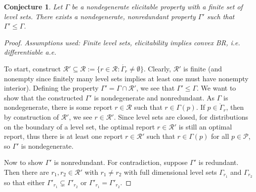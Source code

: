 \documentclass[12pt]{article}
\newcommand{\Comments}{1}
\newcommand{\mynote}[2]{\ifnum\Comments=1\textcolor{#1}{#2}\fi}
\newcommand{\jessie}[1]{\mynote{purple}{[JF: #1]}}
\renewcommand{\P}{\mathcal{P}}
\newcommand{\R}{\mathcal{R}}
\newcommand{\inter}[1]{\mathring{#1}}%
\newtheorem{conjecture}{Conjecture}
\begin{document}
\begin{conjecture}\label{conj:gam-prime-exists}
	Let $\Gamma$ be a nondegenerate elicitable property with a finite set of level sets.
	There exists a nondegenerate, nonredundant property $\Gamma'$ such that $\Gamma' \leq \Gamma$. 
\end{conjecture}
\begin{proof}
\emph{Assumptions used: Finite level sets, elicitability implies convex BR, i.e. differentiable a.e.}

	To start, construct $\R' \subseteq \R := \{ r \in \R : \inter{\Gamma_r} \neq \emptyset \}$.
	Clearly, $\R'$ is finite (and nonempty since finitely many level sets implies at least one must have nonempty interior).
	Defining the property $\Gamma' = \Gamma\cap \R'$, we see that $\Gamma' \leq \Gamma$.
	We want to show that the constructed $\Gamma'$ is nondegenerate and nonredundant.
	As $\Gamma$ is nondegenerate, there is some report $r \in \R$ such that $r \in \Gamma(p)$.
	If $p \in \inter{\Gamma}_r$, then by construction of $\R'$, we see $r \in \R'$.
	Since level sets are closed, for distributions on the boundary of a level set, the optimal report $r \in \R'$ is still an optimal report, thus there is at least one report $r \in \R'$ such that $r \in \Gamma(p)$ for all $p \in \P$, so $\Gamma'$ is nondegenerate. 
	
	
	Now to show $\Gamma'$ is nonredundant.
	For contradiction, suppose $\Gamma'$ is redundant.
	Then there are $r_1, r_2 \in \R'$ with $r_1 \neq r_2$ with full dimensional level sets $\Gamma_{r_1}$ and $\Gamma_{r_2}$ so that either $\Gamma'_{r_1} \subsetneq \Gamma'_{r_2}$ or $\Gamma'_{r_1} = \Gamma'_{r_2}$.
	

\end{proof}
\end{document}
